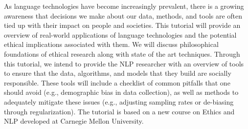 As language technologies have become increasingly prevalent, there is a growing awareness that decisions we make about our data, methods, and tools are often tied up with their impact on people and societies. This tutorial will provide an overview of real-world applications of language technologies and the potential ethical implications associated with them. We will discuss philosophical foundations of ethical research along with state of the art techniques. Through this tutorial, we intend to provide the NLP researcher with an overview of tools to ensure that the data, algorithms, and models that they build are socially responsible. These tools will include a checklist of common pitfalls that one should avoid (e.g., demographic bias in data collection), as well as methods to adequately mitigate these issues (e.g., adjusting sampling rates or de-biasing through regularization). The tutorial is based on a new course on Ethics and NLP developed at Carnegie Mellon University.
